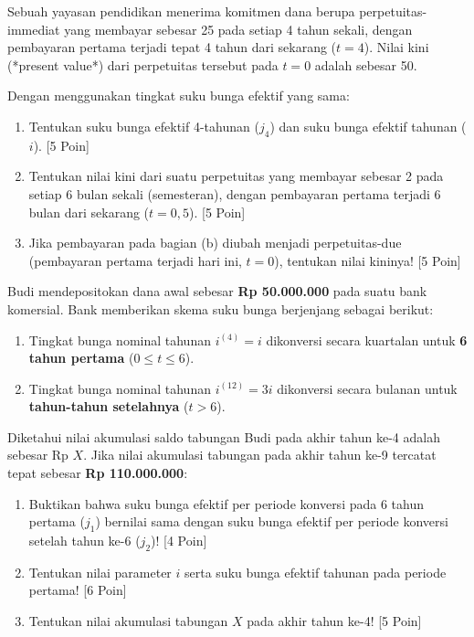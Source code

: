 \documentclass[11pt,a4paper]{article}
\begin{document}
\begin{naskahsoalbox}
Sebuah yayasan pendidikan menerima komitmen dana berupa perpetuitas-immediat yang membayar sebesar 25 pada setiap 4 tahun sekali, dengan pembayaran pertama terjadi tepat 4 tahun dari sekarang ($t=4$). Nilai kini (*present value*) dari perpetuitas tersebut pada $t=0$ adalah sebesar 50.

Dengan menggunakan tingkat suku bunga efektif yang sama:
\begin{enumerate}[label=(\alph*), topsep=2pt, itemsep=2pt]
    \item Tentukan suku bunga efektif 4-tahunan ($j_4$) dan suku bunga efektif tahunan ($i$). \hfill [5 Poin]
    \item Tentukan nilai kini dari suatu perpetuitas yang membayar sebesar 2 pada setiap 6 bulan sekali (semesteran), dengan pembayaran pertama terjadi 6 bulan dari sekarang ($t = 0{,}5$). \hfill [5 Poin]
    \item Jika pembayaran pada bagian (b) diubah menjadi perpetuitas-due (pembayaran pertama terjadi hari ini, $t=0$), tentukan nilai kininya! \hfill [5 Poin]
\end{enumerate}
\end{naskahsoalbox}

\newpage

\begin{naskahsoalbox}
Budi mendepositokan dana awal sebesar \textbf{Rp 50.000.000} pada suatu bank komersial. Bank memberikan skema suku bunga berjenjang sebagai berikut:
\begin{enumerate}[label=(\alph*), topsep=1pt, itemsep=1pt]
    \item Tingkat bunga nominal tahunan $i^{(4)} = i$ dikonversi secara kuartalan untuk \textbf{6 tahun pertama} ($0 \le t \le 6$).
    \item Tingkat bunga nominal tahunan $i^{(12)} = 3i$ dikonversi secara bulanan untuk \textbf{tahun-tahun setelahnya} ($t > 6$).
\end{enumerate}
Diketahui nilai akumulasi saldo tabungan Budi pada akhir tahun ke-4 adalah sebesar Rp $X$. Jika nilai akumulasi tabungan pada akhir tahun ke-9 tercatat tepat sebesar \textbf{Rp 110.000.000}:
\begin{enumerate}[label=(\arabic*), topsep=2pt, itemsep=2pt]
    \item Buktikan bahwa suku bunga efektif per periode konversi pada 6 tahun pertama ($j_1$) bernilai sama dengan suku bunga efektif per periode konversi setelah tahun ke-6 ($j_2$)! \hfill [4 Poin]
    \item Tentukan nilai parameter $i$ serta suku bunga efektif tahunan pada periode pertama! \hfill [6 Poin]
    \item Tentukan nilai akumulasi tabungan $X$ pada akhir tahun ke-4! \hfill [5 Poin]
\end{enumerate}
\end{naskahsoalbox}
\end{document}
